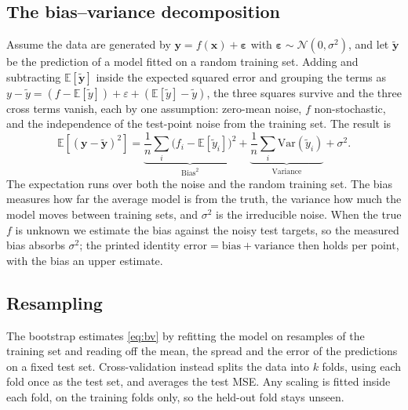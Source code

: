 \documentclass[a4paper,11pt]{article}
\newcommand{\bx}{\boldsymbol{x}}
\newcommand{\by}{\boldsymbol{y}}
\newcommand{\beps}{\boldsymbol{\varepsilon}}
\begin{document}
\subsection{The bias--variance decomposition}
Assume the data are generated by $\by=f(\bx)+\beps$ with
$\beps\sim\mathcal{N}(0,\sigma^2)$, and let $\tilde{\by}$ be the prediction of a
model fitted on a random training set. Adding and subtracting
$\mathbb{E}[\tilde{\by}]$ inside the expected squared error and grouping the
terms as $y-\tilde{y}=(f-\mathbb{E}[\tilde{y}])+\varepsilon
+(\mathbb{E}[\tilde{y}]-\tilde{y})$, the three squares survive and the three
cross terms vanish, each by one assumption: zero-mean noise, $f$ non-stochastic,
and the independence of the test-point noise from the training set. The result
is
\begin{equation}
\mathbb{E}\!\left[(\by-\tilde{\by})^2\right]
=\underbrace{\frac1n\sum_i\bigl(f_i-\mathbb{E}[\tilde{y}_i]\bigr)^2}_{\text{Bias}^2}
+\underbrace{\frac1n\sum_i\mathrm{Var}(\tilde{y}_i)}_{\text{Variance}}
+\sigma^2 .
\label{eq:bv}
\end{equation}
The expectation runs over both the noise and the random training set. The bias
measures how far the average model is from the truth, the variance how much the
model moves between training sets, and $\sigma^2$ is the irreducible noise. When
the true $f$ is unknown we estimate the bias against the noisy test targets, so
the measured bias absorbs $\sigma^2$; the printed identity
$\text{error}=\text{bias}+\text{variance}$ then holds per point, with the bias an
upper estimate.

\subsection{Resampling}
The bootstrap estimates \eqref{eq:bv} by refitting the model on resamples of the
training set and reading off the mean, the spread and the error of the
predictions on a fixed test set. Cross-validation instead splits the data into
$k$ folds, using each fold once as the test set, and averages the test MSE. Any
scaling is fitted inside each fold, on the training folds only, so the held-out
fold stays unseen.
\end{document}

